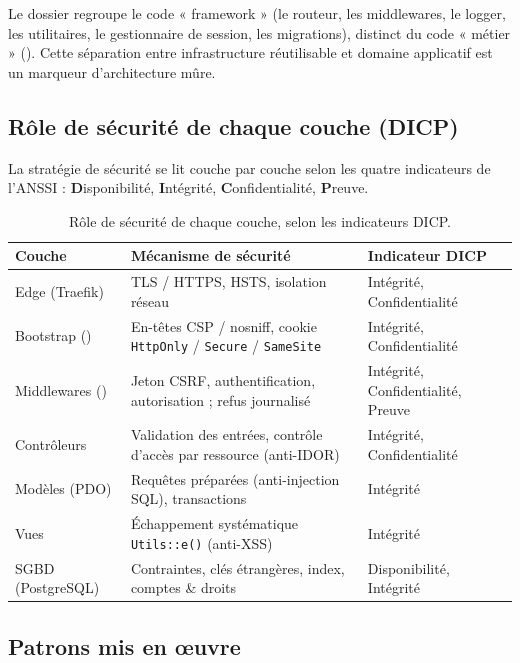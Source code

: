 Le dossier  regroupe le code « framework » (le routeur, les middlewares, le logger,
les utilitaires, le gestionnaire de session, les migrations), distinct du code « métier »
(). Cette séparation entre infrastructure réutilisable et domaine applicatif est
un marqueur d'architecture mûre.

\subsection{Rôle de sécurité de chaque couche (DICP)}

La stratégie de sécurité se lit couche par couche selon les quatre indicateurs de l'ANSSI :
\textbf{D}isponibilité, \textbf{I}ntégrité, \textbf{C}onfidentialité, \textbf{P}reuve.

\begin{table}[ht]
\centering
\renewcommand{\arraystretch}{1.3}
\small
\begin{tabularx}{\textwidth}{@{}L{3cm} X X@{}}
\toprule
\textbf{Couche} & \textbf{Mécanisme de sécurité} & \textbf{Indicateur DICP} \\
\midrule
Edge (Traefik) & TLS / HTTPS, HSTS, isolation réseau & Intégrité, Confidentialité \\
Bootstrap () & En-têtes CSP / nosniff, cookie \texttt{HttpOnly} / \texttt{Secure} / \texttt{SameSite} & Intégrité, Confidentialité \\
Middlewares () & Jeton CSRF, authentification, autorisation ; refus journalisé & Intégrité, Confidentialité, Preuve \\
Contrôleurs & Validation des entrées, contrôle d'accès par ressource (anti-IDOR) & Intégrité, Confidentialité \\
Modèles (PDO) & Requêtes préparées (anti-injection SQL), transactions & Intégrité \\
Vues & Échappement systématique \texttt{Utils::e()} (anti-XSS) & Intégrité \\
SGBD (PostgreSQL) & Contraintes, clés étrangères, index, comptes \& droits & Disponibilité, Intégrité \\
\bottomrule
\end{tabularx}
\caption{Rôle de sécurité de chaque couche, selon les indicateurs DICP.}
\label{tab:dicp}
\end{table}

\subsection{Patrons mis en œuvre}

